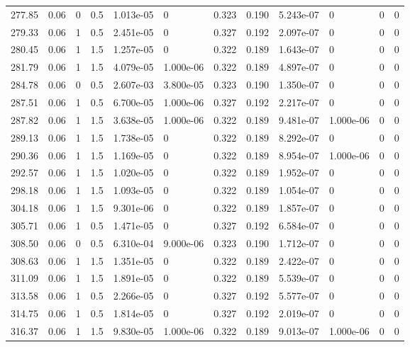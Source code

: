 \documentclass[preview]{standalone}
\begin{document}
{{{\begin{tabular}{L{1.2cm}C{1.2cm} C{0.3cm}C{0.5cm} C{1.4cm}C{1.4cm} C{1.4cm}C{1.4cm} C{1.6cm}C{1.6cm} C{1.6cm}C{1.6cm}}
  277.85  &  0.06  & 0     & 0.5 &  1.013e-05  & 0  &  0.323&   0.190& 5.243e-07 & 0   &  0 & 0  \\ 
  279.33  &  0.06  & 1     & 0.5 &  2.451e-05  & 0  &  0.327&   0.192& 2.097e-07 & 0   &  0 & 0  \\ 
  280.45  &  0.06  & 1     & 1.5 &  1.257e-05  & 0  &  0.322&   0.189& 1.643e-07 & 0   &  0 & 0  \\ 
  281.79  &  0.06  & 1     & 1.5 &  4.079e-05  & 1.000e-06  &  0.322&   0.189& 4.897e-07 & 0   &  0 & 0  \\ 
  284.78  &  0.06  & 0     & 0.5 &  2.607e-03  & 3.800e-05  &  0.323&   0.190& 1.350e-07 & 0   &  0 & 0  \\ 
  287.51  &  0.06  & 1     & 0.5 &  6.700e-05  & 1.000e-06  &  0.327&   0.192& 2.217e-07 & 0   &  0 & 0  \\ 
  287.82  &  0.06  & 1     & 1.5 &  3.638e-05  & 1.000e-06  &  0.322&   0.189& 9.481e-07 & 1.000e-06   &  0 & 0  \\ 
  289.13  &  0.06  & 1     & 1.5 &  1.738e-05  & 0  &  0.322&   0.189& 8.292e-07 & 0   &  0 & 0  \\ 
  290.36  &  0.06  & 1     & 1.5 &  1.169e-05  & 0  &  0.322&   0.189& 8.954e-07 & 1.000e-06   &  0 & 0  \\ 
  292.57  &  0.06  & 1     & 1.5 &  1.020e-05  & 0  &  0.322&   0.189& 1.952e-07 & 0   &  0 & 0  \\ 
  298.18  &  0.06  & 1     & 1.5 &  1.093e-05  & 0  &  0.322&   0.189& 1.054e-07 & 0   &  0 & 0  \\ 
  304.18  &  0.06  & 1     & 1.5 &  9.301e-06  & 0  &  0.322&   0.189& 1.857e-07 & 0   &  0 & 0  \\ 
  305.71  &  0.06  & 1     & 0.5 &  1.471e-05  & 0  &  0.327&   0.192& 6.584e-07 & 0   &  0 & 0  \\ 
  308.50  &  0.06  & 0     & 0.5 &  6.310e-04  & 9.000e-06  &  0.323&   0.190& 1.712e-07 & 0   &  0 & 0  \\ 
  308.63  &  0.06  & 1     & 1.5 &  1.351e-05  & 0  &  0.322&   0.189& 2.422e-07 & 0   &  0 & 0  \\ 
  311.09  &  0.06  & 1     & 1.5 &  1.891e-05  & 0  &  0.322&   0.189& 5.539e-07 & 0   &  0 & 0  \\ 
  313.58  &  0.06  & 1     & 0.5 &  2.266e-05  & 0  &  0.327&   0.192& 5.577e-07 & 0   &  0 & 0  \\ 
  314.75  &  0.06  & 1     & 0.5 &  1.814e-05  & 0  &  0.327&   0.192& 2.019e-07 & 0   &  0 & 0  \\ 
  316.37  &  0.06  & 1     & 1.5 &  9.830e-05  & 1.000e-06  &  0.322&   0.189& 9.013e-07 & 1.000e-06   &  0 & 0  \\ 

\end{tabular}}}}
\end{document}
